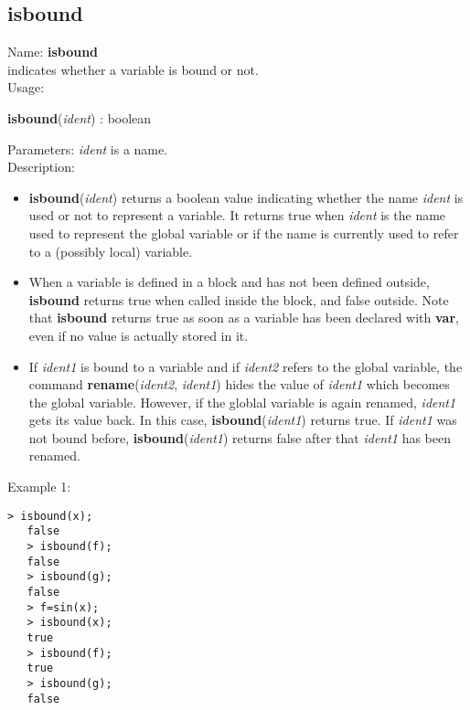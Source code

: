 \subsection{ isbound }
\noindent Name: \textbf{isbound}\\
indicates whether a variable is bound or not.\\

\noindent Usage: 
\begin{center}
\textbf{isbound}(\emph{ident}) : \textsf{boolean}\\
\end{center}
Parameters: 
\emph{ident} is a name.\\

\noindent Description: \begin{itemize}

\item \textbf{isbound}(\emph{ident}) returns a boolean value indicating whether the name \emph{ident}
   is used or not to represent a variable. It returns true when \emph{ident} is the 
   name used to represent the global variable or if the name is currently used
   to refer to a (possibly local) variable.

\item When a variable is defined in a block and has not been defined outside, 
   \textbf{isbound} returns true when called inside the block, and false outside.
   Note that \textbf{isbound} returns true as soon as a variable has been declared with 
   \textbf{var}, even if no value is actually stored in it.

\item If \emph{ident1} is bound to a variable and if \emph{ident2} refers to the global 
   variable, the command \textbf{rename}(\emph{ident2}, \emph{ident1}) hides the value of \emph{ident1}
   which becomes the global variable. However, if the globlal variable is again
   renamed, \emph{ident1} gets its value back. In this case, \textbf{isbound}(\emph{ident1}) returns
   true. If \emph{ident1} was not bound before, \textbf{isbound}(\emph{ident1}) returns false after
   that \emph{ident1} has been renamed.
\end{itemize}
\noindent Example 1: 
\begin{center}\begin{minipage}{14.8cm}\begin{Verbatim}[frame=single]
   > isbound(x);
   false
   > isbound(f);
   false
   > isbound(g);
   false
   > f=sin(x);
   > isbound(x);
   true
   > isbound(f);
   true
   > isbound(g);
   false
\end{Verbatim}
\end{minipage}\end{center}
